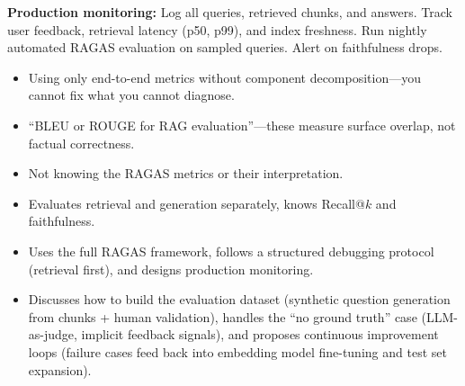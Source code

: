 \begin{interviewq}
\textbf{Production monitoring:} Log all queries, retrieved chunks, and answers. Track user feedback, retrieval latency (p50, p99), and index freshness. Run nightly automated RAGAS evaluation on sampled queries. Alert on faithfulness drops.

\redflags
\begin{itemize}
    \item Using only end-to-end metrics without component decomposition---you cannot fix what you cannot diagnose.
    \item ``BLEU or ROUGE for RAG evaluation''---these measure surface overlap, not factual correctness.
    \item Not knowing the RAGAS metrics or their interpretation.
\end{itemize}


\goodgreat
\begin{itemize}
    \item {} Evaluates retrieval and generation separately, knows Recall@$k$ and faithfulness.
    \item {} Uses the full RAGAS framework, follows a structured debugging protocol (retrieval first), and designs production monitoring.
    \item {} Discusses how to build the evaluation dataset (synthetic question generation from chunks + human validation), handles the ``no ground truth'' case (LLM-as-judge, implicit feedback signals), and proposes continuous improvement loops (failure cases feed back into embedding model fine-tuning and test set expansion).
\end{itemize}

\end{interviewq}



